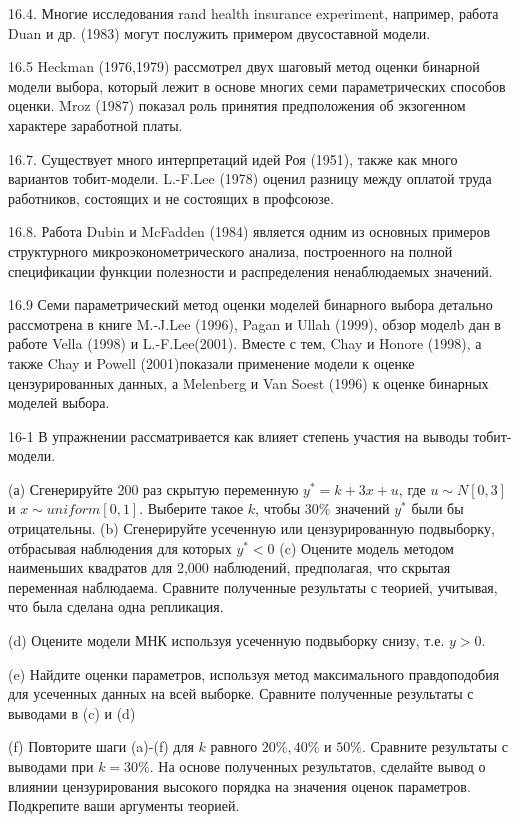 16.4. Многие исследования rand health insurance experiment, например, работа Duan и др. (1983) могут послужить примером двусоставной модели.

16.5 Heckman (1976,1979) рассмотрел двух шаговый метод оценки бинарной модели выбора, который лежит в основе многих семи параметрических способов оценки. Mroz (1987) показал роль принятия предположения об экзогенном характере заработной платы.

16.7. Существует много интерпретаций идей Роя (1951), также как много вариантов тобит-модели. L.-F.Lee (1978) оценил разницу между оплатой труда работников, состоящих и не состоящих в профсоюзе.

16.8. Работа Dubin и McFadden (1984) является одним из основных примеров структурного микроэконометрического анализа, построенного на полной спецификации функции полезности и распределения ненаблюдаемых значений.

16.9 Семи параметрический метод оценки моделей бинарного выбора детально рассмотрена в книге M.-J.Lee (1996), Pagan и Ullah (1999), обзор моделb дан в работе Vella (1998) и L.-F.Lee(2001). Вместе с тем, Chay и Honore (1998), а также Chay и Powell (2001)показали применение модели к оценке цензурированных данных, а Melenberg и Van Soest (1996) к оценке бинарных моделей выбора. 

16-1 В упражнении рассматривается как влияет степень участия на выводы тобит-модели.

(а) Сгенерируйте 200 раз скрытую переменную $y^{*}=k+3x+u$, где $u{\sim}N[0,3]$ и $x{\sim}uniform[0,1]$. Выберите такое $k$, чтобы $30\%$ значений $y^{*}$ были бы отрицательны.
(b) Сгенерируйте усеченную или цензурированную подвыборку, отбрасывая наблюдения для которых $y^{*}<0$
(c) Оцените модель методом наименьших квадратов для 2,000 наблюдений, предполагая, что скрытая переменная наблюдаема. Сравните полученные результаты с теорией, учитывая, что была сделана одна репликация.

(d) Оцените модели МНК используя усеченную подвыборку снизу, т.е. $y>0$.

(e) Найдите оценки параметров, используя метод максимального правдоподобия для усеченных данных на всей выборке. Сравните полученные результаты с выводами в (c) и (d)

(f) Повторите шаги (a)-(f) для $k$ равного $20\%, 40\%$ и $50\%$. Сравните результаты с выводами при $k=30\%$. На основе полученных результатов, сделайте вывод о влиянии цензурирования высокого порядка на значения оценок параметров. Подкрепите ваши аргументы теорией.

